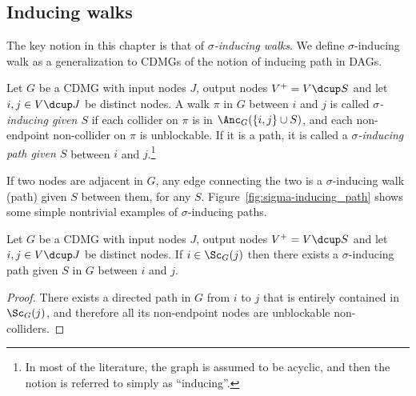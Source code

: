 \subsection{Inducing walks}

The key notion in this chapter is that of \emph{$\sigma$-inducing walks}.
We define $\sigma$-inducing walk as a generalization to CDMGs of the notion of inducing path \cite{VermaPearl1990} in DAGs. %
\begin{Def}\label{def:sigma-inducing_path}
Let $G$ be a CDMG with input nodes $J$, output nodes $V^+ = V \dcup S$ and let $i,j \in V \dcup J$ be distinct nodes.
A walk $\pi$ in $G$ between $i$ and $j$ is called \emph{$\sigma$-inducing given $S$} if  each collider on $\pi$ is in $\Anc_{G}(\{i,j\}\cup S)$, and each non-endpoint non-collider on $\pi$ is unblockable. 
If it is a path, it is called a \emph{$\sigma$-inducing path given $S$} between $i$ and $j$.\footnote{In most of the literature, the graph is assumed to be acyclic, and then the notion is referred to simply as ``inducing''.}
\end{Def}
If two nodes are adjacent in $G$, any edge connecting the two is a $\sigma$-inducing walk (path) given $S$ between them, for any $S$.
Figure~\ref{fig:sigma-inducing_path} shows some simple nontrivial examples of $\sigma$-inducing paths.
\begin{Lem}\label{lem:sigma-inducing_path_in_scc}
Let $G$ be a CDMG with input nodes $J$, output nodes $V^+ = V \dcup S$ and let $i,j \in V \dcup J$ be distinct nodes.
If $i \in \Sc_G(j)$ then there exists a $\sigma$-inducing path given $S$ in $G$ between $i$ and $j$.
\end{Lem}
\begin{proof}
There exists a directed path in $G$ from $i$ to $j$ that is entirely contained in $\Sc_G(j)$, and therefore all its non-endpoint nodes are unblockable non-colliders.
\end{proof}

